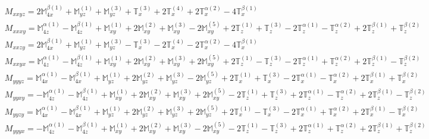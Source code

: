 \documentclass[fleqn,8pt,landscape]{jsarticle}
\begin{document}
\begin{align*}
& M_{xxyz} = 2 \mathbb{M}_{4x}^{\beta(1)} + \mathbb{M}_{yz}^{(1)} + \mathbb{M}_{yz}^{(3)} + \mathbb{T}_{x}^{(3)} + 2 \mathbb{T}_{x}^{(4)} + 2 \mathbb{T}_{x}^{\alpha(2)} - 4 \mathbb{T}_{x}^{\beta(1)} \\
& M_{xxxy} = \mathbb{M}_{4z}^{\alpha(1)} - \mathbb{M}_{4z}^{\beta(1)} + \mathbb{M}_{xy}^{(1)} + 2 \mathbb{M}_{xy}^{(2)} + \mathbb{M}_{xy}^{(3)} - 2 \mathbb{M}_{xy}^{(5)} + 2 \mathbb{T}_{z}^{(1)} + \mathbb{T}_{z}^{(3)} - 2 \mathbb{T}_{z}^{\alpha(1)} - \mathbb{T}_{z}^{\alpha(2)} + 2 \mathbb{T}_{z}^{\beta(1)} + \mathbb{T}_{z}^{\beta(2)} \\
& M_{xxzy} = 2 \mathbb{M}_{4x}^{\beta(1)} + \mathbb{M}_{yz}^{(1)} + \mathbb{M}_{yz}^{(3)} - \mathbb{T}_{x}^{(3)} - 2 \mathbb{T}_{x}^{(4)} - 2 \mathbb{T}_{x}^{\alpha(2)} - 4 \mathbb{T}_{x}^{\beta(1)} \\
& M_{xxyx} = \mathbb{M}_{4z}^{\alpha(1)} - \mathbb{M}_{4z}^{\beta(1)} + \mathbb{M}_{xy}^{(1)} + 2 \mathbb{M}_{xy}^{(2)} + \mathbb{M}_{xy}^{(3)} + 2 \mathbb{M}_{xy}^{(5)} + 2 \mathbb{T}_{z}^{(1)} - \mathbb{T}_{z}^{(3)} - 2 \mathbb{T}_{z}^{\alpha(1)} + \mathbb{T}_{z}^{\alpha(2)} + 2 \mathbb{T}_{z}^{\beta(1)} - \mathbb{T}_{z}^{\beta(2)} \\
& M_{yyyz} = \mathbb{M}_{4x}^{\alpha(1)} - \mathbb{M}_{4x}^{\beta(1)} + \mathbb{M}_{yz}^{(1)} + 2 \mathbb{M}_{yz}^{(2)} + \mathbb{M}_{yz}^{(3)} - 2 \mathbb{M}_{yz}^{(5)} + 2 \mathbb{T}_{x}^{(1)} + \mathbb{T}_{x}^{(3)} - 2 \mathbb{T}_{x}^{\alpha(1)} - \mathbb{T}_{x}^{\alpha(2)} + 2 \mathbb{T}_{x}^{\beta(1)} + \mathbb{T}_{x}^{\beta(2)} \\
& M_{yyxy} = - \mathbb{M}_{4z}^{\alpha(1)} - \mathbb{M}_{4z}^{\beta(1)} + \mathbb{M}_{xy}^{(1)} + 2 \mathbb{M}_{xy}^{(2)} + \mathbb{M}_{xy}^{(3)} + 2 \mathbb{M}_{xy}^{(5)} - 2 \mathbb{T}_{z}^{(1)} + \mathbb{T}_{z}^{(3)} + 2 \mathbb{T}_{z}^{\alpha(1)} - \mathbb{T}_{z}^{\alpha(2)} + 2 \mathbb{T}_{z}^{\beta(1)} - \mathbb{T}_{z}^{\beta(2)} \\
& M_{yyzy} = \mathbb{M}_{4x}^{\alpha(1)} - \mathbb{M}_{4x}^{\beta(1)} + \mathbb{M}_{yz}^{(1)} + 2 \mathbb{M}_{yz}^{(2)} + \mathbb{M}_{yz}^{(3)} + 2 \mathbb{M}_{yz}^{(5)} + 2 \mathbb{T}_{x}^{(1)} - \mathbb{T}_{x}^{(3)} - 2 \mathbb{T}_{x}^{\alpha(1)} + \mathbb{T}_{x}^{\alpha(2)} + 2 \mathbb{T}_{x}^{\beta(1)} - \mathbb{T}_{x}^{\beta(2)} \\
& M_{yyyx} = - \mathbb{M}_{4z}^{\alpha(1)} - \mathbb{M}_{4z}^{\beta(1)} + \mathbb{M}_{xy}^{(1)} + 2 \mathbb{M}_{xy}^{(2)} + \mathbb{M}_{xy}^{(3)} - 2 \mathbb{M}_{xy}^{(5)} - 2 \mathbb{T}_{z}^{(1)} - \mathbb{T}_{z}^{(3)} + 2 \mathbb{T}_{z}^{\alpha(1)} + \mathbb{T}_{z}^{\alpha(2)} + 2 \mathbb{T}_{z}^{\beta(1)} + \mathbb{T}_{z}^{\beta(2)} \\

\end{align*}
\end{document}
